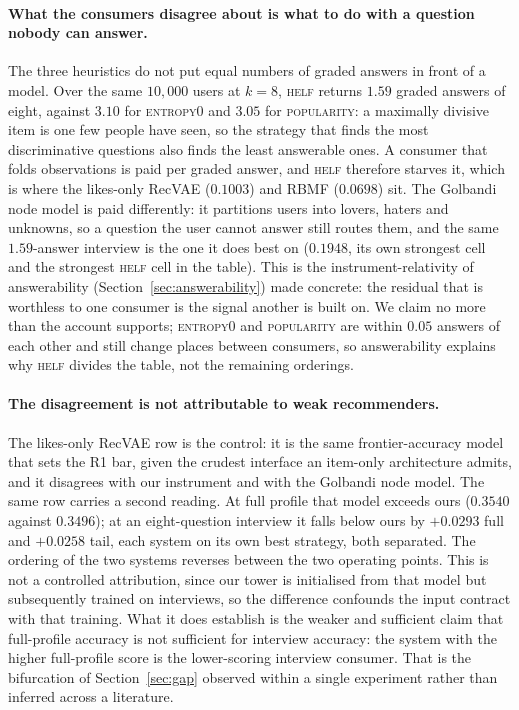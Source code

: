 \documentclass[acmsmall,review,anonymous]{acmart}
\begin{document}
\paragraph{What the consumers disagree about is what to do with a question nobody can answer.} The three heuristics do not put equal numbers of graded answers in front of a model. Over the same $10{,}000$ users at $k{=}8$, \textsc{helf} returns $1.59$ graded answers of eight, against $3.10$ for \textsc{entropy0} and $3.05$ for \textsc{popularity}: a maximally divisive item is one few people have seen, so the strategy that finds the most discriminative questions also finds the least answerable ones. A consumer that folds observations is paid per graded answer, and \textsc{helf} therefore starves it, which is where the likes-only RecVAE ($0.1003$) and RBMF ($0.0698$) sit. The Golbandi node model is paid differently: it partitions users into lovers, haters and unknowns, so a question the user cannot answer still routes them, and the same $1.59$-answer interview is the one it does best on ($0.1948$, its own strongest cell and the strongest \textsc{helf} cell in the table). This is the instrument-relativity of answerability (Section~\ref{sec:answerability}) made concrete: the residual that is worthless to one consumer is the signal another is built on. We claim no more than the account supports; \textsc{entropy0} and \textsc{popularity} are within $0.05$ answers of each other and still change places between consumers, so answerability explains why \textsc{helf} divides the table, not the remaining orderings.

\paragraph{The disagreement is not attributable to weak recommenders.} The likes-only RecVAE row is the control: it is the same frontier-accuracy model that sets the R1 bar, given the crudest interface an item-only architecture admits, and it disagrees with our instrument and with the Golbandi node model. The same row carries a second reading. At full profile that model exceeds ours ($0.3540$ against $0.3496$); at an eight-question interview it falls below ours by $+0.0293$ full and $+0.0258$ tail, each system on its own best strategy, both separated. The ordering of the two systems reverses between the two operating points. This is not a controlled attribution, since our tower is initialised from that model but subsequently trained on interviews, so the difference confounds the input contract with that training. What it does establish is the weaker and sufficient claim that full-profile accuracy is not sufficient for interview accuracy: the system with the higher full-profile score is the lower-scoring interview consumer. That is the bifurcation of Section~\ref{sec:gap} observed within a single experiment rather than inferred across a literature.
\end{document}
